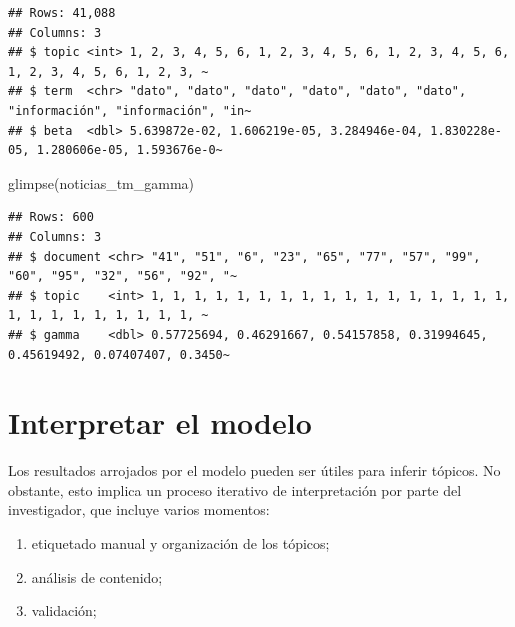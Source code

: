 \documentclass[
]{book}
\newenvironment{Shaded}{\begin{snugshade}}{\end{snugshade}}
\newcommand{\FunctionTok}[1]{\textcolor[rgb]{0.00,0.00,0.00}{#1}}
\newcommand{\NormalTok}[1]{#1}
\providecommand{\tightlist}{%
  \setlength{\itemsep}{0pt}\setlength{\parskip}{0pt}}
\begin{document}
\begin{verbatim}
## Rows: 41,088
## Columns: 3
## $ topic <int> 1, 2, 3, 4, 5, 6, 1, 2, 3, 4, 5, 6, 1, 2, 3, 4, 5, 6, 1, 2, 3, 4, 5, 6, 1, 2, 3, ~
## $ term  <chr> "dato", "dato", "dato", "dato", "dato", "dato", "información", "información", "in~
## $ beta  <dbl> 5.639872e-02, 1.606219e-05, 3.284946e-04, 1.830228e-05, 1.280606e-05, 1.593676e-0~
\end{verbatim}

\begin{Shaded}
\begin{Highlighting}[]
\FunctionTok{glimpse}\NormalTok{(noticias\_tm\_gamma)}
\end{Highlighting}
\end{Shaded}

\begin{verbatim}
## Rows: 600
## Columns: 3
## $ document <chr> "41", "51", "6", "23", "65", "77", "57", "99", "60", "95", "32", "56", "92", "~
## $ topic    <int> 1, 1, 1, 1, 1, 1, 1, 1, 1, 1, 1, 1, 1, 1, 1, 1, 1, 1, 1, 1, 1, 1, 1, 1, 1, 1, ~
## $ gamma    <dbl> 0.57725694, 0.46291667, 0.54157858, 0.31994645, 0.45619492, 0.07407407, 0.3450~
\end{verbatim}

\hypertarget{interpretar-el-modelo}{%
\section{Interpretar el modelo}\label{interpretar-el-modelo}}

Los resultados arrojados por el modelo pueden ser útiles para inferir tópicos. No obstante, esto implica un proceso iterativo de interpretación por parte del investigador, que incluye varios momentos:

\begin{enumerate}
\def\labelenumi{\arabic{enumi}.}
\tightlist
\item
  etiquetado manual y organización de los tópicos;
\item
  análisis de contenido;
\item
  validación;
\end{enumerate}
\end{document}
